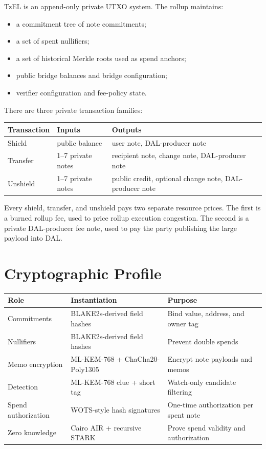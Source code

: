 \documentclass[11pt]{article}
\newcommand{\TzEL}{TzEL}
\begin{document}
\TzEL{} is an append-only private UTXO system. The rollup maintains:

\begin{itemize}
  \item a commitment tree of note commitments;
  \item a set of spent nullifiers;
  \item a set of historical Merkle roots used as spend anchors;
  \item public bridge balances and bridge configuration;
  \item verifier configuration and fee-policy state.
\end{itemize}

There are three private transaction families:

\begin{center}
\begin{tabular}{lll}
\toprule
Transaction & Inputs & Outputs \\
\midrule
Shield & public balance & user note, DAL-producer note \\
Transfer & 1--7 private notes & recipient note, change note, DAL-producer note \\
Unshield & 1--7 private notes & public credit, optional change note, DAL-producer note \\
\bottomrule
\end{tabular}
\end{center}

Every shield, transfer, and unshield pays two separate resource prices. The
first is a burned rollup fee, used to price rollup execution congestion. The
second is a private DAL-producer fee note, used to pay the party publishing the
large payload into DAL.

\section{Cryptographic Profile}

\begin{center}
\begin{tabular}{lll}
\toprule
Role & Instantiation & Purpose \\
\midrule
Commitments & BLAKE2s-derived field hashes & Bind value, address, and owner tag \\
Nullifiers & BLAKE2s-derived field hashes & Prevent double spends \\
Memo encryption & ML-KEM-768 + ChaCha20-Poly1305 & Encrypt note payloads and memos \\
Detection & ML-KEM-768 clue + short tag & Watch-only candidate filtering \\
Spend authorization & WOTS-style hash signatures & One-time authorization per spent note \\
Zero knowledge & Cairo AIR + recursive STARK & Prove spend validity and authorization \\
\bottomrule
\end{tabular}
\end{center}
\end{document}
